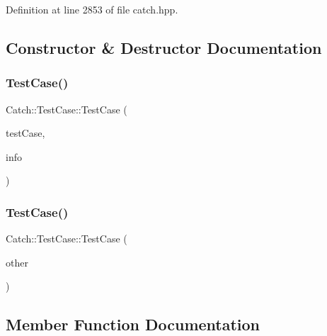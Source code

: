 Definition at line 2853 of file catch.\+hpp.



\subsection{Constructor \& Destructor Documentation}
\hypertarget{class_catch_1_1_test_case_a03a5b913484681bd6d398dc5e9c2a907}{}\label{class_catch_1_1_test_case_a03a5b913484681bd6d398dc5e9c2a907} 
\subsubsection{\texorpdfstring{Test\+Case()}{TestCase()}\hspace{0.1cm}{\footnotesize\ttfamily [1/2]}}
{\footnotesize\ttfamily Catch\+::\+Test\+Case\+::\+Test\+Case (\begin{DoxyParamCaption}\item[{\hyperlink{struct_catch_1_1_i_test_case}{I\+Test\+Case} $\ast$}]{test\+Case,  }\item[{\hyperlink{struct_catch_1_1_test_case_info}{Test\+Case\+Info} const \&}]{info }\end{DoxyParamCaption})}

\hypertarget{class_catch_1_1_test_case_ac0011d3789edc3e44edb41f13c4775a0}{}\label{class_catch_1_1_test_case_ac0011d3789edc3e44edb41f13c4775a0} 
\subsubsection{\texorpdfstring{Test\+Case()}{TestCase()}\hspace{0.1cm}{\footnotesize\ttfamily [2/2]}}
{\footnotesize\ttfamily Catch\+::\+Test\+Case\+::\+Test\+Case (\begin{DoxyParamCaption}\item[{\hyperlink{class_catch_1_1_test_case}{Test\+Case} const \&}]{other }\end{DoxyParamCaption})}



\subsection{Member Function Documentation}
\hypertarget{class_catch_1_1_test_case_a1ea0d79f49156cebea076fe1ba50d2b6}{}\label{class_catch_1_1_test_case_a1ea0d79f49156cebea076fe1ba50d2b6} 
